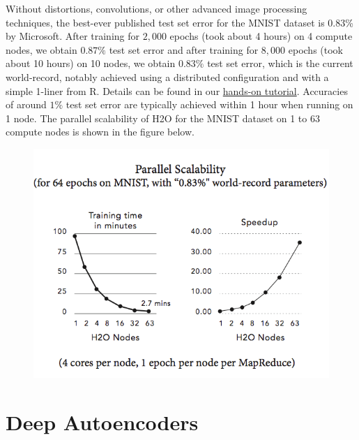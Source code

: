 Without distortions, convolutions, or other advanced image processing techniques, the best-ever published test set error for the MNIST dataset is $0.83$\% by Microsoft. After training for $2,000$ epochs (took about 4 hours) on 4 compute nodes, we obtain $0.87\%$ test set error and after training for $8,000$ epochs (took about 10 hours) on 10 nodes, we obtain $0.83\%$ test set error, which is the current world-record, notably achieved using a distributed configuration and with a simple 1-liner from R. Details can be found in our \href{http://learn.h2o.ai/content/hands-on_training/deep_learning.html}{hands-on tutorial}. Accuracies of around $1\%$ test set error are typically achieved within 1 hour when running on 1 node.
The parallel scalability of H2O for the MNIST dataset on 1 to 63 compute nodes is shown in the figure below.
\begin{figure}[h!]
\centering
\includegraphics{scalability_new.png}
\end{figure}
\bigskip
\bigskip
\bigskip
\section{Deep Autoencoders}
\label{sec:DeepAutoencoders}  

